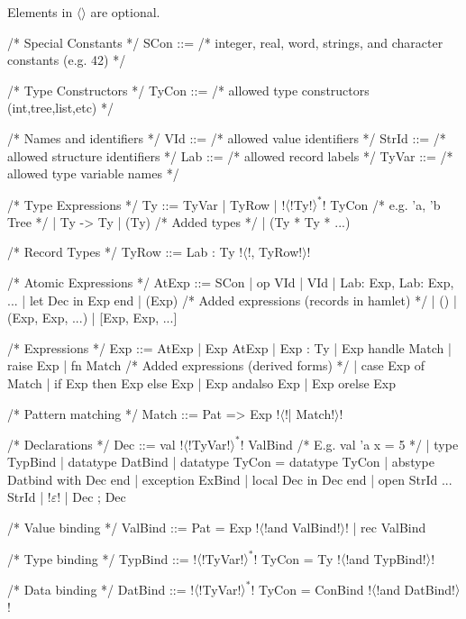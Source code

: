\documentclass[a4paper,11pt]{article}
\begin{document}
Elements in $\langle\rangle$ are optional.

\begin{grm}
/* Special Constants */
SCon ::= /* integer, real, word, strings, 
            and character constants (e.g. 42) */

/* Type Constructors */
TyCon ::= /* allowed type constructors (int,tree,list,etc) */

/* Names and identifiers */
VId   ::= /* allowed value identifiers */
StrId ::= /* allowed structure identifiers */
Lab   ::= /* allowed record labels */
TyVar ::= /* allowed type variable names */

/* Type Expressions */
Ty ::= TyVar
     | { TyRow }
     | !$\langle$!Ty!$\rangle^*$! TyCon /* e.g. 'a, 'b Tree */
     | Ty -> Ty
     | (Ty)
     /* Added types */
     | (Ty * Ty * ...)

/* Record Types */
TyRow ::= Lab : Ty !$\langle$!, TyRow!$\rangle$!

/* Atomic Expressions */
AtExp ::= SCon 
        | op VId 
        | VId 
        | {Lab: Exp, Lab: Exp, ...} 
        | let Dec in Exp end 
        | (Exp) 
        /* Added expressions (records in hamlet) */
        | () 
        | (Exp, Exp, ...) 
        | [Exp, Exp, ...]

/* Expressions */
Exp ::= AtExp 
      | Exp AtExp 
      | Exp : Ty 
      | Exp handle Match
      | raise Exp 
      | fn Match
      /* Added expressions (derived forms) */
      | case Exp of Match 
      | if Exp then Exp else Exp
      | Exp andalso Exp 
      | Exp orelse Exp

/* Pattern matching */
Match ::= Pat => Exp !$\langle$!| Match!$\rangle$!

/* Declarations */
Dec ::= val !$\langle$!TyVar!$\rangle^*$! ValBind /* E.g. val 'a x = 5 */
      | type TypBind
      | datatype DatBind
      | datatype TyCon = datatype TyCon
      | abstype Datbind with Dec end
      | exception ExBind
      | local Dec in Dec end
      | open StrId ... StrId
      | !$\varepsilon$!
      | Dec ; Dec
      
/* Value binding */
ValBind ::= Pat = Exp !$\langle$!and ValBind!$\rangle$!
          | rec ValBind

/* Type binding */
TypBind ::= !$\langle$!TyVar!$\rangle^*$!  TyCon = Ty !$\langle$!and TypBind!$\rangle$!

/* Data binding */
DatBind ::= !$\langle$!TyVar!$\rangle^*$!  TyCon = ConBind !$\langle$!and DatBind!$\rangle$!


\end{grm}
\end{document}
